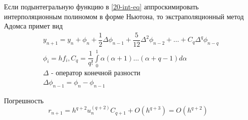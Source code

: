 Если подынтегральную функцию в \eqref{20-int-eq} аппроскимировать интерполяционным
полиномом в форме Ньютона, то экстраполяционный метод Адомса примет вид
\begin{equation}
  \begin{split}
    &y_{n + 1} = y_n + \phi_n + \dfrac{1}{2}\Delta \phi_{n - 1} +
    \dfrac{5}{12}\Delta^2\phi_{n - 2} + \ldots + C_q\Delta^q\phi_{n - q}\\
    &\phi_i = h f_i, C_q = \dfrac{1}{q!}\int\limits_0^1\alpha(\alpha + 1) \ldots
    (\alpha + q - 1)d\alpha\\
    &\Delta \text{ - оператор конечной разности}\\
    & \Delta \phi_{n - 1} = \phi_n - \phi_{n - 1}
  \end{split}
\end{equation}

Погрешность
\begin{equation}
  r_{n + 1} = h^{q + 2}u_n^{(q + 2)}C_{q + 1} + O(h^{q + 3}) = O(h^{q + 2})
\end{equation}
